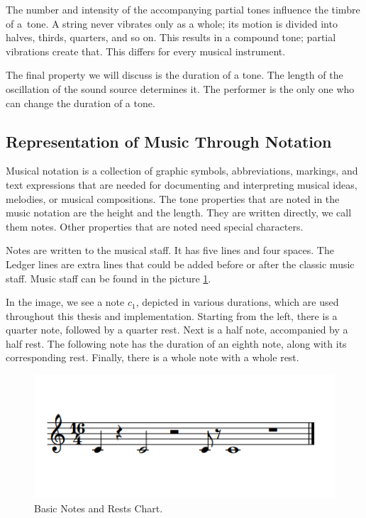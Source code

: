 The number and intensity of the accompanying partial tones influence the timbre of a~tone. A string never vibrates only as a whole; its motion is divided into halves, thirds, quarters, and so on. This results in a compound tone; partial vibrations create that. This differs for every musical instrument.

The final property we will discuss is the duration of a tone. The length of the oscillation of the sound source determines it. The performer is the only one who can change the duration of a tone.

\subsection*{Representation of Music Through Notation}
Musical notation is a collection of graphic symbols, abbreviations, markings, and text expressions that are needed for documenting and interpreting musical ideas, melodies, or musical compositions. The tone properties that are noted in the music notation are the height and the length. They are written directly, we call them notes. Other properties that are noted need special characters.

Notes are written to the musical staff. It has five lines and four spaces. The Ledger lines are extra lines that could be added before or after the classic music staff. Music staff can be found in the picture \ref{fig:notes}. 

In the image, we see a note $c_1$, depicted in various durations, which are used throughout this thesis and implementation. Starting from the left, there is a quarter note, followed by a quarter rest. Next is a half note, accompanied by a half rest. The following note has the duration of an eighth note, along with its corresponding rest. Finally, there is a whole note with a whole rest.

\begin{figure}[H]
    \centering
    \includegraphics[scale=0.55]{obrazky-figures/notes.png}
    \caption{Basic Notes and Rests Chart.}
    \label{fig:notes}
\end{figure}

